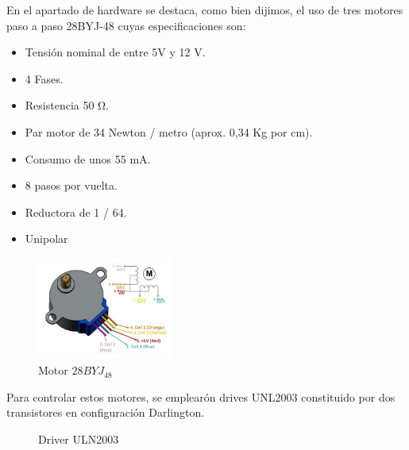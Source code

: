 En el apartado de hardware se destaca, como bien dijimos, el uso de tres 
motores paso a paso 28BYJ-48 cuyas especificaciones son:
\begin{itemize}
  \item Tensión nominal de entre 5V y 12 V.
  \item 4 Fases.
  \item Resistencia 50 Ω.
  \item Par motor de 34 Newton / metro (aprox. 0,34 Kg por cm).
  \item Consumo de unos 55 mA.
  \item 8 pasos por vuelta.
  \item Reductora de 1 / 64.
  \item Unipolar
\end{itemize}
\begin{figure}[!htb]
  \begin{center}
    \includegraphics[width=0.4\textwidth]{imagenes/28BYJ_48.jpg}
  \end{center}
  \caption{Motor $28BYJ_48$}
  \label{fig:28BYJ_48}
\end{figure}
\FloatBarrier
Para controlar estos motores, se emplearón drives UNL2003 constituido por dos transistores en configuración Darlington.
\begin{figure}[!htb]
  \begin{center}
    \qquad
  \end{center}
  \caption{Driver ULN2003}
  \label{fig:Driver ULN2003}
\end{figure}
